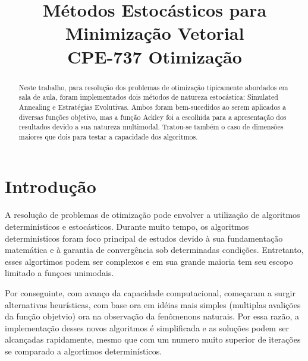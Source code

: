 \documentclass[conference,compsoc]{IEEEtran}
\begin{document}
\title{Métodos Estocásticos para Minimização Vetorial\\ CPE-737 Otimização}


\author{
\and
{}
\and
{}
}


\maketitle

\begin{abstract}
Neste trabalho, para resolução dos problemas de otimização tipicamente abordados em sala de aula, foram implementados dois métodos de natureza estocástica: Simulated Annealing e Estratégias Evolutivas. Ambos foram bem-sucedidos ao serem aplicados a diversas funções objetivo, mas a função Ackley foi a escolhida para a apresentação dos resultados devido a sua natureza multimodal. Tratou-se também o caso de dimensões maiores que dois para testar a capacidade dos algoritmos.\\
\end{abstract}


\IEEEpeerreviewmaketitle


\section{Introdução} %
\vspace{0.1cm}

A resolução de problemas de otimização pode envolver a utilização de algoritmos determinísticos e estocásticos. Durante muito tempo, os algoritmos determinísticos foram foco principal de estudos devido à sua fundamentação matemática e à garantia de convergência sob determinadas condições. Entretanto, esses algortimos podem ser complexos e em sua grande maioria tem seu escopo limitado a funçoes unimodais.

Por conseguinte, com avanço da capacidade computacional, começaram a surgir alternativas heurísticas, com base ora em idéias mais simples (multiplas avalições da função objetvio) ora na observação da fenômenons naturais. Por essa razão, a implementação desses novos algoritmos é simplificada e as soluções podem ser alcançadas rapidamente, mesmo que com um numero muito superior de iterações se comparado a algortimos determinísticos.
\end{document}
